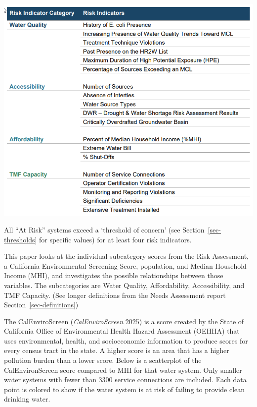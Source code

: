 \documentclass[
  letterpaper,
  DIV=11,
  numbers=noendperiod]{scrartcl}
\begin{document}
\begin{center}
\includegraphics[width=5.64583in,height=\textheight,keepaspectratio]{Risk_Indicators_2021.png}
\end{center}

All ``At Risk'' systems exceed a `threshold of concern' (see
Section~\ref{sec-thresholds} for specific values) for at least four risk
indicators.

This paper looks at the individual subcategory scores from the Risk
Assessment, a California Environmental Screening Score, population, and
Median Household Income (MHI), and investigates the possible
relationships between those variables. The subcategories are Water
Quality, Affordability, Accessibility, and TMF Capacity. (See longer
definitions from the Needs Assessment report
Section~\ref{sec-definitions})

The CalEnviroScreen (\emph{CalEnviroScreen} 2025) is a score created by
the State of California Office of Environmental Health Hazard Assessment
(OEHHA) that uses environmental, health, and socioeconomic information
to produce scores for every census tract in the state. A higher score is
an area that has a higher pollution burden than a lower score. Below is
a scatterplot of the CalEnvironScreen score compared to MHI for that
water system. Only smaller water systems with fewer than 3300 service
connections are included. Each data point is colored to show if the
water system is at risk of failing to provide clean drinking water.
\end{document}
